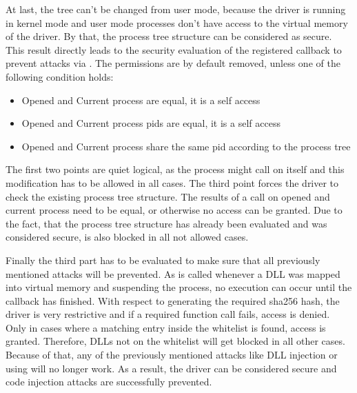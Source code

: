 At last, the tree can't be changed from user mode, because the driver is running in kernel mode and user mode processes don't have access to the virtual memory of the driver. By that, the process tree structure can be considered as secure. This result directly leads to the security evaluation of the registered callback to prevent attacks via . The permissions are by default removed, unless one of the following condition holds:
\begin{itemize}
\item Opened and Current process are equal, it is a self access
\item Opened and Current process pids are equal, it is a self access
\item Opened and Current process share the same pid according to the process tree
\end{itemize}
The first two points are quiet logical, as the process might call  on itself and this modification has to be allowed in all cases. The third point forces the driver to check the existing process tree structure. The results of a  call on opened and current process need to be equal, or otherwise no access can be granted. Due to the fact, that the process tree structure has already been evaluated and was considered secure,  is also blocked in all not allowed cases. 

Finally the third part has to be evaluated to make sure that all previously mentioned attacks will be prevented. As  is called whenever a DLL was mapped into virtual memory and suspending the process, no execution can occur until the callback has finished. With respect to generating the required sha256 hash, the driver is very restrictive and if a required function call fails, access is denied. Only in cases where a matching entry inside the whitelist is found, access is granted. Therefore, DLLs not on the whitelist will get blocked in all other cases. Because of that, any of the previously mentioned attacks like DLL injection or using  will no longer work. As a result, the driver can be considered secure and code injection attacks are successfully prevented.